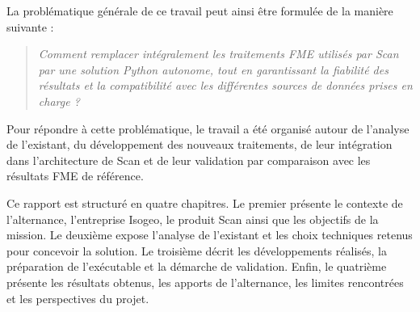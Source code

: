 La problématique générale de ce travail peut ainsi être formulée de la manière
suivante :

\begin{quote}
\textit{Comment remplacer intégralement les traitements FME utilisés par Scan
par une solution Python autonome, tout en garantissant la fiabilité des
résultats et la compatibilité avec les différentes sources de données prises en
charge ?}
\end{quote}

Pour répondre à cette problématique, le travail a été organisé autour de
l'analyse de l'existant, du développement des nouveaux traitements, de leur
intégration dans l'architecture de Scan et de leur validation par comparaison
avec les résultats FME de référence.

Ce rapport est structuré en quatre chapitres. Le premier présente le contexte de
l'alternance, l'entreprise Isogeo, le produit Scan ainsi que les objectifs de la
mission. Le deuxième expose l'analyse de l'existant et les choix techniques
retenus pour concevoir la solution. Le troisième décrit les développements
réalisés, la préparation de l'exécutable et la démarche de validation. Enfin, le
quatrième présente les résultats obtenus, les apports de l'alternance, les
limites rencontrées et les perspectives du projet.


